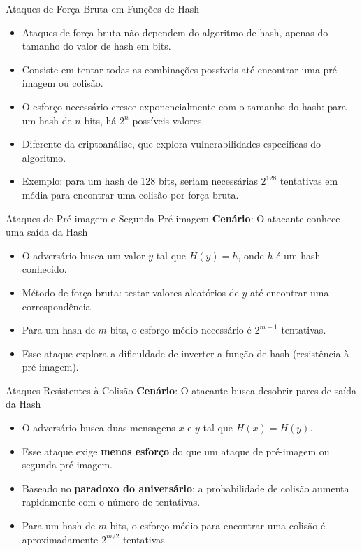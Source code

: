 \begin{frame}{Ataques de Força Bruta em Funções de Hash}
    \begin{itemize}
        \item Ataques de força bruta não dependem do algoritmo de hash, apenas do tamanho do valor de hash em bits.
        \item Consiste em tentar todas as combinações possíveis até encontrar uma pré-imagem ou colisão.
        \item O esforço necessário cresce exponencialmente com o tamanho do hash: para um hash de \(n\) bits, há \(2^n\) possíveis valores.
        \item Diferente da criptoanálise, que explora vulnerabilidades específicas do algoritmo.
        \item Exemplo: para um hash de 128 bits, seriam necessárias \(2^{128}\) tentativas em média para encontrar uma colisão por força bruta.
    \end{itemize}
\end{frame}
\begin{frame}{Ataques de Pré-imagem e Segunda Pré-imagem}
    \textbf{Cenário}: O atacante conhece uma saída da Hash
    \begin{itemize}
        \item O adversário busca um valor \(y\) tal que \(H(y) = h\), onde \(h\) é um hash conhecido.
        \item Método de força bruta: testar valores aleatórios de \(y\) até encontrar uma correspondência.
        \item Para um hash de \(m\) bits, o esforço médio necessário é \(2^{m-1}\) tentativas.
        \item Esse ataque explora a dificuldade de inverter a função de hash (resistência à pré-imagem).
    \end{itemize}
\end{frame}
\begin{frame}{Ataques Resistentes à Colisão}
    \textbf{Cenário}: O atacante busca desobrir pares de saída da Hash
    \begin{itemize}
        \item O adversário busca duas mensagens \(x\) e \(y\) tal que \(H(x) = H(y)\).
        \item Esse ataque exige \textbf{menos esforço} do que um ataque de pré-imagem ou segunda pré-imagem.
        \item Baseado no \textbf{paradoxo do aniversário}: a probabilidade de colisão aumenta rapidamente com o número de tentativas.
        \item Para um hash de \(m\) bits, o esforço médio para encontrar uma colisão é aproximadamente \(2^{m/2}\) tentativas.
    \end{itemize}
\end{frame}
